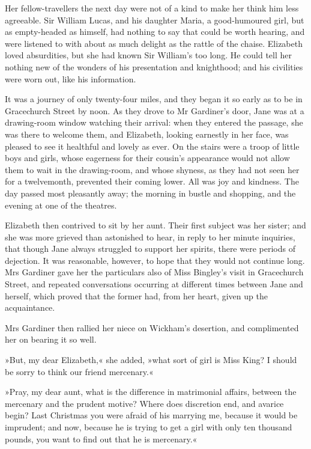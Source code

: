 Her fellow-travellers the next day were not of a kind to make her think him less agreeable. Sir William Lucas, and his daughter Maria, a good-humoured girl, but as empty-headed as himself, had nothing to say that could be worth hearing, and were listened to with about as much delight as the rattle of the chaise. Elizabeth loved absurdities, but she had known Sir William's too long. He could tell her nothing new of the wonders of his presentation and knighthood; and his civilities were worn out, like his information.

It was a journey of only twenty-four miles, and they began it so early as to be in Gracechurch Street by noon. As they drove to Mr Gardiner's door, Jane was at a drawing-room window watching their arrival: when they entered the passage, she was there to welcome them, and Elizabeth, looking earnestly in her face, was pleased to see it healthful and lovely as ever. On the stairs were a troop of little boys and girls, whose eagerness for their cousin's appearance would not allow them to wait in the drawing-room, and whose shyness, as they had not seen her for a twelvemonth, prevented their coming lower. All was joy and kindness. The day passed most pleasantly away; the morning in bustle and shopping, and the evening at one of the theatres.

Elizabeth then contrived to sit by her aunt. Their first subject was her sister; and she was more grieved than astonished to hear, in reply to her minute inquiries, that though Jane always struggled to support her spirits, there were periods of dejection. It was reasonable, however, to hope that they would not continue long. Mrs Gardiner gave her the particulars also of Miss Bingley's visit in Gracechurch Street, and repeated conversations occurring at different times between Jane and herself, which proved that the former had, from her heart, given up the acquaintance.

Mrs Gardiner then rallied her niece on Wickham's desertion, and complimented her on bearing it so well.

»But, my dear Elizabeth,« she added, »what sort of girl is Miss King? I should be sorry to think our friend mercenary.«

»Pray, my dear aunt, what is the difference in matrimonial affairs, between the mercenary and the prudent motive? Where does discretion end, and avarice begin? Last Christmas you were afraid of his marrying me, because it would be imprudent; and now, because he is trying to get a girl with only ten thousand pounds, you want to find out that he is mercenary.«

